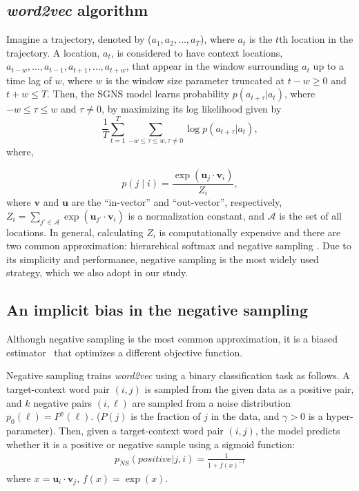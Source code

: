 \documentclass[12pt,a4paper]{article}
\newcommand{\vect}[1]{\boldsymbol{#1}}
\def\given{\mid}
\begin{document}
\subsection{\textit{word2vec} algorithm}
Imagine a trajectory, denoted by ($a_{1}, a_{2}, \ldots, a_{T}$), where $a_{t}$ is the $t$th location in the trajectory. A location, $a_{t}$, is considered to have context locations, $a_{t-w}, \ldots, a_{t-1}, a_{t+1},\ldots, a_{t+w}$, that appear in the window surrounding $a_t$ up to a time lag of $w$, where $w$ is the window size parameter truncated at $t - w \geq 0$ and $t + w \leq T$.
Then, the SGNS model learns probability $p(a_{t + \tau} \vert a_{t})$, where $-w\leq \tau\leq w$ and $\tau \neq 0$,  by maximizing its log likelihood given by
%
%
\begin{equation}
	\frac{1}{T}\sum_{t = 1}^{T} \sum_{-w \leq \tau \leq w, \tau \neq 0} \log p(a_{t + \tau} \vert a_{t}),
\end{equation}
where,

%
%
\begin{equation}
	p(j \given i) = \frac{\exp(\vect{u}_j \cdot \vect{v}_{i})}{Z_i}, \label{eq:cond_prob_w2v}
\end{equation}
where $\vect{v}$ and $\vect{u}$ are the ``in-vector'' and ``out-vector'', respectively,  $Z_i=\sum_{j' \in \mathcal{A}} \exp(\vect{u}_{j'} \cdot \vect{v}_{i})$ is a normalization constant, and $\mathcal{A}$ is the set of all locations. In general, calculating $Z_i$ is computationally expensive and there are two common approximation:
hierarchical softmax \autocite{morin2005hierarchical} and negative sampling \autocite{mikolov2013word2vec}.
Due to its simplicity and performance, negative sampling is the most widely used strategy, which we also adopt in our study.


\subsection{An implicit bias in the negative sampling}
Although negative sampling is the most common approximation, it is a biased estimator~\autocite{Chia2010,Dyer2014} that optimizes a different objective function.

Negative sampling trains {\it word2vec} using a binary classification task as follows.
A target-context word pair $(i,j)$ is sampled from the given data as a positive pair, and $k$ negative pairs $(i,\ell)$ are sampled from a noise distribution $p_0(\ell)=P^\gamma(\ell)$. ($P(j)$ is the fraction of $j$ in the data, and $\gamma>0$ is a hyper-parameter).
Then, given a target-context word pair $(i,j)$, the model predicts whether it is a positive or negative sample using a sigmoid function:
\begin{align}
	\label{eq:sigmoid}
	 p_{NS}(positive|j,i) = \frac{1}{1 + f(x)^{-1}}
\end{align}
where $x=\vect{u}_i \cdot \vect{v}_j$,  $f(x)=\exp(x)$.
\end{document}
